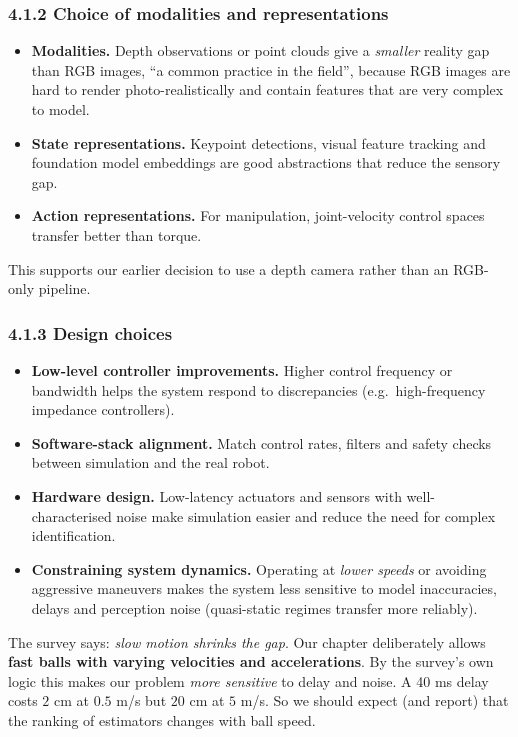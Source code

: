 \documentclass[11pt,a4paper]{article}
\begin{document}
\subsubsection*{4.1.2 Choice of modalities and representations}
\begin{itemize}
\item \textbf{Modalities.} Depth observations or point clouds give a \emph{smaller} reality gap
than RGB images, ``a common practice in the field'', because RGB images are hard to render
photo-realistically and contain features that are very complex to model.
\item \textbf{State representations.} Keypoint detections, visual feature tracking and foundation
model embeddings are good abstractions that reduce the sensory gap.
\item \textbf{Action representations.} For manipulation, joint-velocity control spaces transfer
better than torque.
\end{itemize}
This supports our earlier decision to use a depth camera rather than an RGB-only pipeline.

\subsubsection*{4.1.3 Design choices}
\begin{itemize}
\item \textbf{Low-level controller improvements.} Higher control frequency or bandwidth helps the
system respond to discrepancies (e.g.\ high-frequency impedance controllers).
\item \textbf{Software-stack alignment.} Match control rates, filters and safety checks between
simulation and the real robot.
\item \textbf{Hardware design.} Low-latency actuators and sensors with well-characterised noise make
simulation easier and reduce the need for complex identification.
\item \textbf{Constraining system dynamics.} Operating at \emph{lower speeds} or avoiding aggressive
maneuvers makes the system less sensitive to model inaccuracies, delays and perception noise
(quasi-static regimes transfer more reliably).
\end{itemize}

\begin{ours}
The survey says: \emph{slow motion shrinks the gap}. Our chapter deliberately allows
\textbf{fast balls with varying velocities and accelerations}. By the survey's own logic this makes
our problem \emph{more sensitive} to delay and noise. A 40 ms delay costs $2$ cm at $0.5$ m/s but
$20$ cm at $5$ m/s. So we should expect (and report) that the ranking of estimators changes with
ball speed.
\end{ours}
\end{document}
